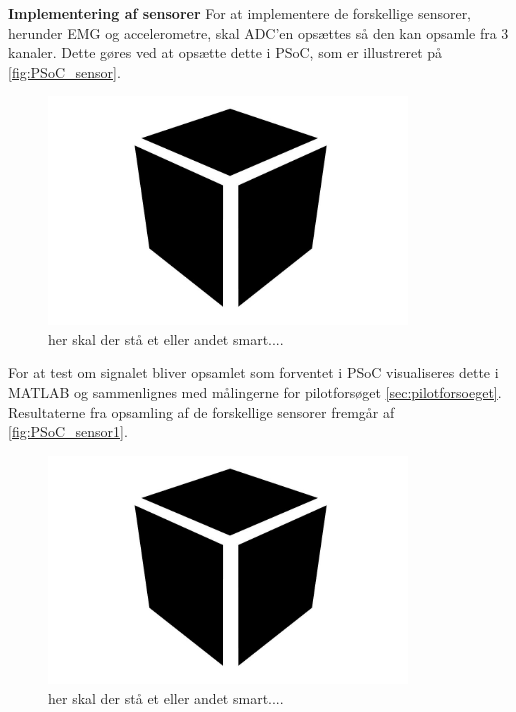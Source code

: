 \textbf{Implementering af sensorer}
For at implementere de forskellige sensorer, herunder EMG og accelerometre, skal ADC'en opsættes så den kan opsamle fra 3 kanaler. Dette gøres ved at opsætte dette i PSoC, som er illustreret på \autoref{fig:PSoC_sensor}.

\begin{figure}[H]
\centering
\includegraphics[width=0.85\textwidth]{figures/blackbox}
\caption{her skal der stå et eller andet smart....}
\label{fig:PSoC_sensor}
\end{figure}

For at test om signalet bliver opsamlet som forventet i PSoC visualiseres dette i MATLAB og sammenlignes med målingerne for pilotforsøget \autoref{sec:pilotforsoeget}. Resultaterne fra opsamling af de forskellige sensorer fremgår af \autoref{fig:PSoC_sensor1}.

\begin{figure}[H]
\centering
\includegraphics[width=0.85\textwidth]{figures/blackbox}
\caption{her skal der stå et eller andet smart....}
\label{fig:PSoC_sensor1}
\end{figure}